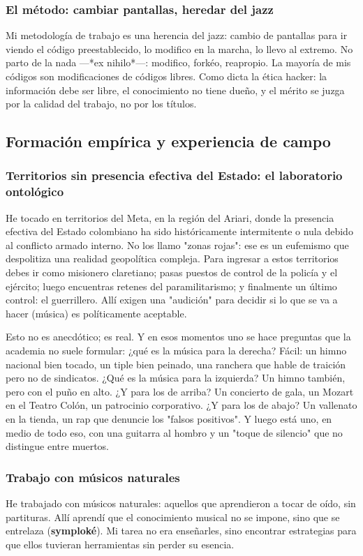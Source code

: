 \documentclass[14pt, a4paper]{article}
\begin{document}
\subsubsection{El método: cambiar pantallas, heredar del jazz}
\label{metodo-jazz}
Mi metodología de trabajo es una herencia del jazz: cambio de
pantallas para ir viendo el código preestablecido, lo modifico en la
marcha, lo llevo al extremo. No parto de la nada —*ex nihilo*—:
modifico, forkéo, reapropio. La mayoría de mis códigos son
modificaciones de códigos libres. Como dicta la ética hacker: la
información debe ser libre, el conocimiento no tiene dueño, y el
mérito se juzga por la calidad del trabajo, no por los títulos.
\subsection{Formación empírica y experiencia de campo}
\label{formacion-empirica}
\subsubsection{Territorios sin presencia efectiva del Estado: el laboratorio ontológico}
\label{territorios-conflicto}
He tocado en territorios del Meta, en la región del Ariari, donde la
presencia efectiva del Estado colombiano ha sido históricamente
intermitente o nula debido al conflicto armado interno. No los llamo
"zonas rojas": ese es un eufemismo que despolitiza una realidad
geopolítica compleja. Para ingresar a estos territorios debes ir como
misionero claretiano; pasas puestos de control de la policía y el
ejército; luego encuentras retenes del paramilitarismo; y finalmente
un último control: el guerrillero. Allí exigen una "audición" para
decidir si lo que se va a hacer (música) es políticamente aceptable.

Esto no es anecdótico; es real. Y en esos momentos uno se hace
preguntas que la academia no suele formular: ¿qué es la música para
la derecha? Fácil: un himno nacional bien tocado, un tiple bien
peinado, una ranchera que hable de traición pero no de sindicatos.
¿Qué es la música para la izquierda? Un himno también, pero con el
puño en alto. ¿Y para los de arriba? Un concierto de gala, un Mozart
en el Teatro Colón, un patrocinio corporativo. ¿Y para los de abajo?
Un vallenato en la tienda, un rap que denuncie los "falsos positivos".
Y luego está uno, en medio de todo eso, con una guitarra al hombro y
un "toque de silencio" que no distingue entre muertos.
\subsubsection{Trabajo con músicos naturales}
\label{musicos-naturales}
He trabajado con músicos naturales: aquellos que aprendieron a tocar
de oído, sin partituras. Allí aprendí que el conocimiento musical no
se impone, sino que se entrelaza (\textbf{symploké}). Mi tarea no era
enseñarles, sino encontrar estrategias para que ellos tuvieran
herramientas sin perder su esencia.
\end{document}
